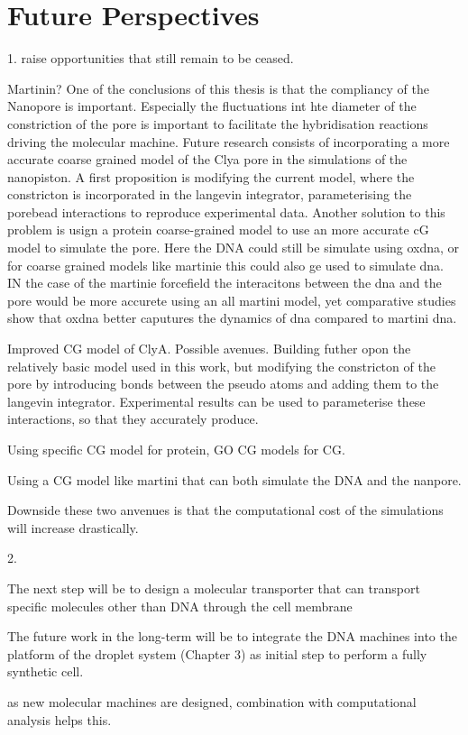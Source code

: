 \section{Future Perspectives}



1.
raise opportunities that still remain to be ceased.

Martinin?
One of the conclusions of this thesis is that the compliancy of the Nanopore is
important. Especially the fluctuations int hte diameter of the constriction of the pore
is important to facilitate the hybridisation reactions driving the molecular machine.
Future research consists of incorporating a more accurate coarse grained model of the
Clya pore in the simulations of the nanopiston. A first proposition is modifying the
current model, where the constricton is incorporated in the langevin integrator,
parameterising the porebead interactions to reproduce experimental data. Another solution
to this problem is usign a protein coarse-grained model to use an more accurate cG model
to simulate the pore. Here the DNA could still be simulate using oxdna, or for coarse
grained models like martinie this could also ge used to simulate dna. IN the case of the
martinie forcefield the interacitons between the dna and the pore would be more accurete
using an all martini model, yet comparative studies show that oxdna better caputures the
dynamics of dna compared to martini dna.


Improved CG model of ClyA. Possible avenues. Building futher opon the relatively basic
model used in this work, but modifying the constricton of the pore by introducing bonds
between the pseudo atoms and adding them to the langevin integrator. Experimental results
can be used to parameterise these interactions, so that they accurately produce.

Using specific CG model for protein, GO CG models for  CG.

Using a CG model like martini that can both simulate the DNA and the nanpore.


Downside these two anvenues is that the computational cost of the simulations will
increase drastically.

2.

The next step will be to design a molecular transporter that can transport specific
molecules other than DNA through the cell membrane

The future work in the long-term will be to
integrate the DNA machines into the platform of the droplet system (Chapter 3) as initial step to
perform a fully synthetic cell.

as new molecular machines are designed, combination with computational analysis helps
this.

